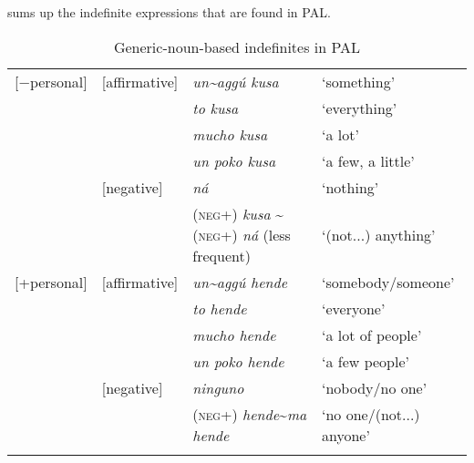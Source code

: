 \documentclass[output=paper,colorlinks,citecolor=brown]{langscibook}
\begin{document}
 sums up the indefinite expressions that are found in PAL.

\begin{table}
\small
\begin{tabularx}{\textwidth}{llXX}
\lsptoprule
{[$-$personal]}& {[affirmative]} & \textit{un\~{}aggú kusa} & ‘something’\\
 &  & \textit{to kusa} & ‘everything’\\
 &  & \textit{mucho kusa} & ‘a lot’\\
 &  & \textit{un poko kusa} & ‘a few, a little’\\
  \tablevspace
 & {[negative]} & \textit{ná} & ‘nothing’\\
 &  & (\textsc{neg}+) \textit{kusa} \newline \~{}(\textsc{neg}+) \textit{ná} (less frequent) & ‘(not...) anything’\\
 \tablevspace
 {[+personal]}& {[affirmative]} & \textit{un\~{}aggú hende} & ‘somebody\slash someone’\\
 &  & \textit{to hende} & ‘everyone’\\
 &  & \textit{mucho hende} & ‘a lot of people’\\
 &  & \textit{un poko hende} & ‘a few people’\\
  \tablevspace
 & {[negative]} & \textit{ninguno} & ‘nobody\slash no one’\\
 &  & (\textsc{neg}+) \textit{hende}\~{}\textit{ma hende} & ‘no one\slash (not...) anyone’\\
\lspbottomrule
\end{tabularx}
\caption{Generic-noun-based indefinites in PAL}
\label{tab:gutmat1}
\end{table}
\end{document}
